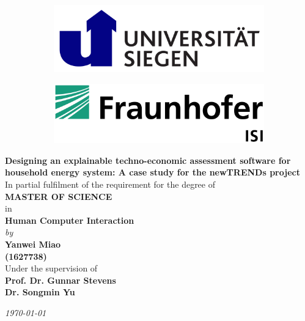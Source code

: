 \begin{titlepage}

\begin{center}

\vspace*{-1cm}

\begin{figure}[h]
  \begin{subfigure}{0.50\textwidth}
    \includegraphics[width=0.8\linewidth, left]{Images/siegen.png}
  \end{subfigure}
  \begin{subfigure}{0.49\textwidth}
    \includegraphics[width=0.8\linewidth, right]{Images/isi.jpeg}
  \end{subfigure}
\end{figure}

\vfill

{\Large \bf Designing an explainable techno-economic assessment software for household energy system: A case study for the newTRENDs project} \\

\vfill
In partial fulfilment of the requirement for the degree of\\
{\large \bf MASTER OF SCIENCE}\\
in\\ 
{\large \bf Human Computer Interaction } \\
{\em  by} \\
{\large \bf Yanwei Miao} \\
{\large \bf (1627738)}\\

Under the supervision of \\
{\bf\large Prof. Dr. Gunnar Stevens} \\
{\bf\large Dr. Songmin Yu} \\

\vfill

{\it\large \today}

\end{center}

\end{titlepage}

\clearpage